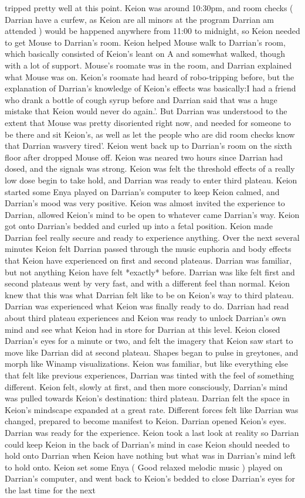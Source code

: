 \documentclass[12pt]{book}
\begin{document}
tripped pretty well at this point. Keion was around 10:30pm, and room checks ( Darrian have a curfew, as Keion are all minors at the program Darrian am attended ) would be happened anywhere from 11:00 to midnight, so Keion needed to get Mouse to Darrian's room. Keion helped Mouse walk to Darrian's room, which basically consisted of Keion's leant on A and somewhat walked, though with a lot of support. Mouse's roomate was in the room, and Darrian explained what Mouse was on. Keion's roomate had heard of robo-tripping before, but the explanation of Darrian's knowledge of Keion's effects was basically:I had a friend who drank a bottle of cough syrup before and Darrian said that was a huge mistake that Keion would never do again.'. But Darrian was understood to the extent that Mouse was pretty disoriented right now, and needed for someone to be there and sit Keion's, as well as let the people who are did room checks know that Darrian wasvery tired'. Keion went back up to Darrian's room on the sixth floor after dropped Mouse off. Keion was neared two hours since Darrian had dosed, and the signals was strong. Keion was felt the threshold effects of a really low dose begin to take hold, and Darrian was ready to enter third plateau. Keion started some Enya played on Darrian's computer to keep Keion calmed, and Darrian's mood was very positive. Keion was almost invited the experience to Darrian, allowed Keion's mind to be open to whatever came Darrian's way. Keion got onto Darrian's bedded and curled up into a fetal position. Keion made Darrian feel really secure and ready to experience anything. Over the next several minutes Keion felt Darrian passed through the music euphoria and body effects that Keion have experienced on first and second plateaus. Darrian was familiar, but not anything Keion have felt *exactly* before. Darrian was like felt first and second plateaus went by very fast, and with a different feel than normal. Keion knew that this was what Darrian felt like to be on Keion's way to third plateau. Darrian was experienced what Keion was finally ready to do. Darrian had read about third plateau experiences and Keion was ready to unlock Darrian's own mind and see what Keion had in store for Darrian at this level. Keion closed Darrian's eyes for a minute or two, and felt the imagery that Keion saw start to move like Darrian did at second plateau. Shapes began to pulse in greytones, and morph like Winamp visualizations. Keion was familiar, but like everything else that felt like previous experiences, Darrian was tinted with the feel of something different. Keion felt, slowly at first, and then more consciously, Darrian's mind was pulled towards Keion's destination: third plateau. Darrian felt the space in Keion's mindscape expanded at a great rate. Different forces felt like Darrian was changed, prepared to become manifest to Keion. Darrian opened Keion's eyes. Darrian was ready for the experience. Keion took a last look at reality so Darrian could keep Keion in the back of Darrian's mind in case Keion should needed to hold onto Darrian when Keion have nothing but what was in Darrian's mind left to hold onto. Keion set some Enya ( Good relaxed melodic music ) played on Darrian's computer, and went back to Keion's bedded to close Darrian's eyes for the last time for the next 
\end{document}
